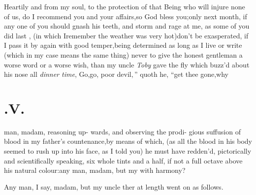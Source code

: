 \documentclass{article}
\begin{document}
Heartily and from my soul, to the protection of that Being who
will injure none of us, do I recommend you and your
affairs,\tsk so God bless you;\tsk only next month, if any one
of you should gnash his teeth, and storm and rage at me, as some of
you did last , (in which I\break remember the weather
was very hot)\tsk don’t be exasperated, if I pass it by
again with good temper,\tsk being determined as long as I live or
write (which in my case means the same thing) never to give the
honest gentleman a worse word or a worse wish, than my uncle \textit{Toby} gave
the fly which buzz’d about his nose all
\textit{dinner time}, \tsh \lqq Go,\tsh go, poor
devil,\,” quoth he, “\tsh get thee gone,\tsh why

\section{.\quad  V.}

 man, madam, reasoning up-\break 
wards, and observing the prodi-\break
gious suffusion of blood in my
father’s countenance,\tsk by means of which, (as all the
blood in his body seemed to rush up into his face, as I told you) he
must have redden’d, pictorically and scientifically speaking, six
whole tints and a half, if not a full octave above his natural
co\-lour:\tsh any man, madam, but my\break 
{}
with harmony?

Any man, I say, madam, but my uncle
ther at length went on as follows.
\end{document}
